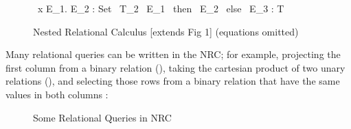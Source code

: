 \documentclass[11pt]{article}
\theoremstyle{remark}
\theoremstyle{definition}
\begin{document}
\begin{figure}[h]
\caption{Nested Relational Calculus [extends Fig 1] (equations omitted)}

{\Gamma {} \ x \in E_1. E_2 : {\sf Set} \ T_2}
{\Gamma {} \ E_1 \ {\sf then} \ E_2 \ {\sf else} \ E_3 : T}
\end{figure}

Many relational queries can be written in the NRC; for example, projecting the first column from a binary relation (), taking the cartesian product of two unary relations (), and selecting those rows from a binary relation that have the same values in both columns :

\begin{figure}[h]
\caption{Some Relational Queries in NRC}



\end{figure}
\end{document}
